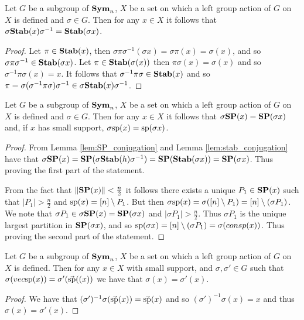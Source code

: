 \documentclass[../paper.tex]{subfiles}
\begin{document}
\begin{lem}
  \label{lem:stab_conjugation}
  Let $G$ be a subgroup of $\text{\textbf{Sym}}_n$, $X$ be a set on which a left group action
  of $G$ on $X$ is defined and $\sigma \in G$. Then for any $x \in X$ it follows
  that $\sigma \text{\textbf{Stab}} (x) \sigma^{-1} = \text{\textbf{Stab}}(\sigma x)$.
\end{lem}

\begin{proof}
  Let $\pi \in \text{\textbf{Stab}}(x)$, then $\sigma \pi \sigma^{-1}(\sigma x) = \sigma \pi
  (x) = \sigma (x)$, and so $\sigma \pi \sigma^{-1} \in \text{\textbf{Stab}}(\sigma x)$. Let
  $\pi \in \text{\textbf{Stab}}(\sigma (x))$ then $\pi \sigma (x) = \sigma (x)$ and so
  $\sigma^{-1} \pi \sigma (x) = x$. It follows that $\sigma^{-1} \pi \sigma \in
  \text{\textbf{Stab}}(x)$ and so $\pi = \sigma (\sigma^{-1} \pi \sigma) \sigma ^{-1} \in
  \sigma \text{\textbf{Stab}}(x) \sigma^{-1}$.
\end{proof}

\begin{lem}
  \label{lem:support_mapping}
  Let $G $ be a subgroup of $\text{\textbf{Sym}}_n$, $X$ be a set on which a left group action
  of $G$ on $X$ is defined and $\sigma \in G$. Then for any $x \in X$ it follows
  that $\sigma \text{\textbf{SP}} (x) = \text{\textbf{SP}} (\sigma x)$ and, if $x$ has small support, $\sigma
  \text{sp} (x) = \text{sp} (\sigma x)$.
\end{lem}
\begin{proof}
  From Lemma \ref{lem:SP_conjugation} and Lemma \ref{lem:stab_conjugation} have
  that $\sigma \text{\textbf{SP}} (x) = \text{\textbf{SP}}(\sigma \text{\textbf{Stab}}(h) \sigma^{-1}) = \text{\textbf{SP}} (\text{\textbf{Stab}}(\sigma
  x)) = \text{\textbf{SP}} (\sigma x)$. Thus proving the first part of the statement.

  From the fact that $\| \text{\textbf{SP}}(x) \| < \frac{n}{2}$ it follows there exists a
  unique $P_1 \in \text{\textbf{SP}}(x)$ such that $\vert P_1 \vert > \frac{n}{2}$ and
  $\text{sp}(x) = [n] \setminus P_1$. But then $\sigma \text{sp} (x) = \sigma([n]
  \setminus P_1) = [n] \setminus (\sigma P_1)$. We note that $\sigma P_1 \in
  \sigma \text{\textbf{SP}} (x) = \text{\textbf{SP}}(\sigma x)$ and $\vert \sigma P_1 \vert > \frac{n}{2}$.
  Thus $\sigma P_1$ is the unique largest partition in $\text{\textbf{SP}}(\sigma x)$, and so
  $\text{sp}(\sigma x) = [n]\setminus (\sigma P_1) = \sigma (consp(x))$. Thus
  proving the second part of the statement.
\end{proof}

\begin{lem}
  Let $G$ be a subgroup of $\text{\textbf{Sym}}_n$, $X$ be a set on which a left group action
  of $G$ on $X$ is defined. Then for any $x \in X$ with small support, and
  $\sigma, \sigma' \in G$ such that $\sigma (vec{\text{sp}}(x)) = \sigma'
  (\vec{\text{sp}}((x))$ we have that $\sigma (x) = \sigma'(x)$.
\end{lem}
\begin{proof}
  We have that $(\sigma')^{-1}\sigma(\vec{\text{sp}}(x)) = \vec{\text{sp}}(x)$ and so
  $(\sigma')^{-1} \sigma (x) = x$ and thus $\sigma (x) = \sigma' (x)$.
\end{proof}
\end{document}
